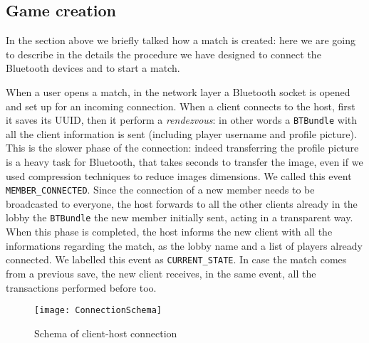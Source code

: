 \subsection{Game creation}

In the section above we briefly talked how a match is created: here we are 
going to describe in the details the procedure we have designed to connect the 
Bluetooth devices and to start a match.

When a user opens a match, in the network layer a Bluetooth socket is opened 
and set up for an incoming connection. When a client connects to the host, first 
it saves its UUID, then it perform a \textit{rendezvous}: in other words a 
\texttt{BTBundle} with all the client information is sent (including player 
username and profile picture). This is the slower phase of the connection: 
indeed transferring the profile picture is a heavy task for Bluetooth, that 
takes seconds to transfer the image, even if we used compression techniques to 
reduce images dimensions. We called this event \texttt{MEMBER\_CONNECTED}. 
Since the connection of a new member needs to be broadcasted to everyone, the 
host forwards to all the other clients already in the lobby the 
\texttt{BTBundle} the new member initially sent, acting in a transparent way. 
When this phase is completed, the host informs the new client with all the 
informations regarding the match, as the lobby name and a list of players 
already connected. We labelled this event as \texttt{CURRENT\_STATE}. In case 
the match comes from a previous save, the new client receives, in the same 
event, all the transactions performed before too.

\begin{figure}[t]
 \centering
 \texttt{[image: ConnectionSchema]}
 \caption{Schema of client-host connection}
 \label{fig:gbConnectionSchema}
\end{figure}

